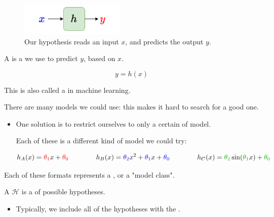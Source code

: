         \begin{figure}[H]
        \centering
            \includegraphics[width=50mm,scale=0.5]{images/regression_images/hypothesis_box.png}
        
            \caption*{Our hypothesis reads an input $x$, and predicts the output $y$.}
        \end{figure}

        \begin{definition}
            A  is a  we use to predict $y$, based on $x$.

            \begin{equation*}
                y = h(x)
            \end{equation*}

            This is also called a  in machine learning.
        \end{definition}

        There are many models we could use: this makes it hard to search for a good one.

        \begin{itemize}
            \item One solution is to restrict ourselves to only a certain  of model. 

            Each of these is a different kind of model we could try:

            \begin{equation*}
                h_A(x) = \red{\theta_1} x + \red{\theta_0} 
                \qquad \qquad
                h_B(x) = \blu{\theta_2} x^2 + \blu{\theta_1} x + \blu{\theta_0} 
                \qquad \qquad
                h_C(x) = \grn{\theta_2} \sin (\grn{\theta_1} x) + \grn{\theta_0}
            \end{equation*}
        \end{itemize}

        Each of these formats represents a , or a "model class".\\

        \begin{definition}
            A  $\mathcal{H}$ is a  of possible hypotheses.

            \begin{itemize}
                \item Typically, we include all of the hypotheses with the .
            \end{itemize}
        \end{definition}

